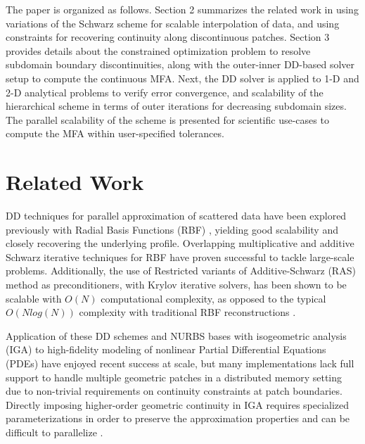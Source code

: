 \documentclass[conference]{IEEEtran}
\begin{document}
The paper is organized as follows. Section 2 summarizes the related work in using variations of the Schwarz scheme for scalable interpolation of data, and using constraints for recovering continuity along discontinuous patches. Section 3 provides details about the constrained optimization problem to resolve subdomain boundary discontinuities, along with the outer-inner DD-based solver setup to compute the continuous MFA. Next, the DD solver is applied to 1-D and 2-D analytical problems to verify error convergence, and scalability of the hierarchical scheme in terms of outer iterations for decreasing subdomain sizes. The parallel scalability of the scheme is presented for scientific use-cases to compute the MFA within user-specified tolerances.


\section{Related Work}

DD techniques for parallel approximation of scattered data have been explored previously with Radial Basis Functions (RBF) \cite{mai-approx-rbf}, yielding good scalability and closely recovering the underlying profile. Overlapping multiplicative and additive Schwarz \cite{orasm-as-ms-2007} iterative techniques for RBF \cite{ddm-rbf} have proven successful to tackle large-scale problems. Additionally, the use of Restricted variants of Additive-Schwarz (RAS) method as preconditioners, with Krylov iterative solvers, has been shown to be scalable \cite{yokota-rasm-rbf} with $O(N)$ computational complexity, as opposed to the typical $O(N log(N))$ complexity with traditional RBF reconstructions \cite{ddm-rbf-fast}. 

Application of these DD schemes and NURBS bases with isogeometric analysis (IGA) to high-fidelity modeling of nonlinear Partial Differential Equations (PDEs) have enjoyed recent success \cite{marini2015parallel, petiga-dalcin-2016} at scale, but many implementations lack full support to handle multiple geometric patches in a distributed memory setting due to non-trivial requirements on continuity constraints at patch boundaries. 
Directly imposing higher-order geometric continuity in IGA requires specialized parameterizations in order to preserve the approximation properties \cite{kapl2018construction} and can be difficult to parallelize \cite{hofer2018fast}. 
\end{document}
